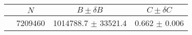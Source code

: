\begin{tabular}{lccc}
\hline
    &   $N$   & $B \pm \delta B$  &  $C \pm \delta C$ \\
\hline
                               & 7209460    & 1014788.7  $\pm$ 33521.4 & 0.662      $\pm$ 0.006 \\
\hline
\end{tabular}
